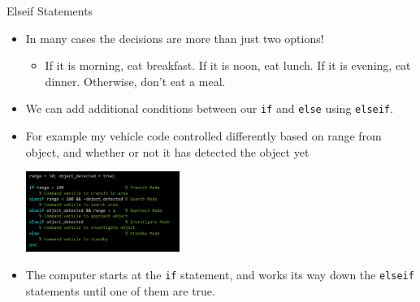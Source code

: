 {}\documentclass[letterpaper,
compress,
xcolor=x11names,
]{beamer}
\begin{document}
\begin{frame}{Elseif Statements}
	\footnotesize
	\begin{itemize}
		\item In many cases the decisions are more than just two options!
		\begin{itemize}
			\item If it is morning, eat breakfast. If it is noon, eat lunch. If it is evening, eat dinner. Otherwise, don't eat a meal.
		\end{itemize}
		\item We can add additional conditions between our \texttt{if} and \texttt{else} using \texttt{elseif}.
		\item For example my vehicle code controlled differently based on range from object, and whether or not it has detected the object yet
		\begin{center}
			\includegraphics[width = 5cm]{elseif_example.png}
		\end{center}
		\item The computer starts at the \texttt{if} statement, and works its way down the \texttt{elseif} statements until one of them are true.
	\end{itemize}
\end{frame}
\end{document}
